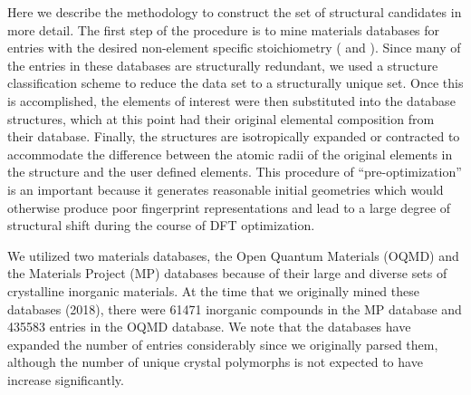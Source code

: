 %
Here we describe the methodology to construct the set of structural candidates in more detail.
%
The first step of the procedure is to mine materials databases for entries with the desired non-element specific stoichiometry ( \ABtwo and \ABthree).
%
Since many of the entries in these databases are structurally redundant,
we used a structure classification scheme to reduce the data set to a structurally unique set.
%
Once this is accomplished, the elements of interest were then substituted into the database structures,
which at this point had their original elemental composition from their database.
%
Finally, the structures are isotropically expanded or contracted to accommodate the difference between the atomic radii of the original elements in the structure and the user defined elements.
%
This procedure of ``pre-optimization'' is an important because it generates reasonable initial geometries which would otherwise produce poor fingerprint representations and lead to a large degree of structural shift during the course of DFT optimization.


%
We utilized two materials databases, the Open Quantum Materials (OQMD)\cite{Saal2013} and the Materials Project (MP) databases\cite{Jain2013} because of their large and diverse sets of crystalline inorganic materials.
%
At the time that we originally mined these databases (2018), there were \num{61471} inorganic compounds in the MP database and \num{435583} entries in the OQMD database.
%
We note that the databases have expanded the number of entries considerably since we originally parsed them,
although the number of unique crystal polymorphs is not expected to have increase significantly.


